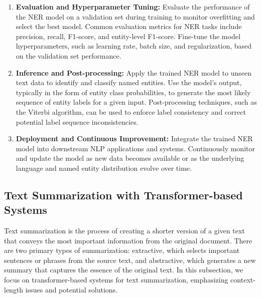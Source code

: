 \documentclass[12pt]{article}
\begin{document}
\begin{enumerate}
\item \textbf{Evaluation and Hyperparameter Tuning:} Evaluate the performance of the NER model on a validation set during training to monitor overfitting and select the best model. Common evaluation metrics for NER tasks include precision, recall, F1-score, and entity-level F1-score. Fine-tune the model hyperparameters, such as learning rate, batch size, and regularization, based on the validation set performance.

\item \textbf{Inference and Post-processing:} Apply the trained NER model to unseen text data to identify and classify named entities. Use the model's output, typically in the form of entity class probabilities, to generate the most likely sequence of entity labels for a given input. Post-processing techniques, such as the Viterbi algorithm, can be used to enforce label consistency and correct potential label sequence inconsistencies.

\item \textbf{Deployment and Continuous Improvement:} Integrate the trained NER model into downstream NLP applications and systems. Continuously monitor and update the model as new data becomes available or as the underlying language and named entity distribution evolve over time.
\end{enumerate}


\subsection{Text Summarization with Transformer-based Systems}

Text summarization is the process of creating a shorter version of a given text that conveys the most important information from the original document. There are two primary types of summarization: extractive, which selects important sentences or phrases from the source text, and abstractive, which generates a new summary that captures the essence of the original text. In this subsection, we focus on transformer-based systems for text summarization, emphasizing context-length issues and potential solutions.
\end{document}
